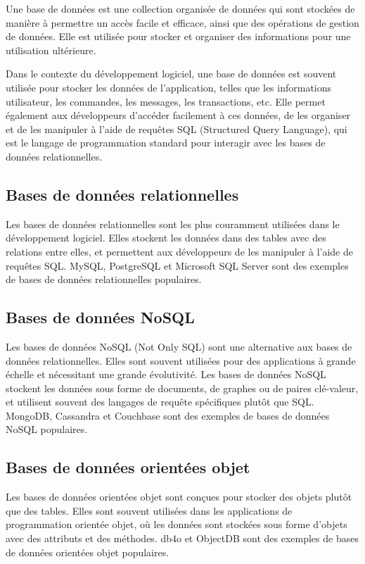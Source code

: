 Une base de données est une collection organisée de données qui sont stockées de manière à permettre un accès facile et efficace, ainsi que des opérations de gestion de données. Elle est utilisée pour stocker et organiser des informations pour une utilisation ultérieure.

Dans le contexte du développement logiciel, une base de données est souvent utilisée pour stocker les données de l'application, telles que les informations utilisateur, les commandes, les messages, les transactions, etc. Elle permet également aux développeurs d'accéder facilement à ces données, de les organiser et de les manipuler à l'aide de requêtes SQL (Structured Query Language), qui est le langage de programmation standard pour interagir avec les bases de données relationnelles.

\subsection{Bases de données relationnelles}\label{subsec:relational-databases}
Les bases de données relationnelles sont les plus couramment utilisées dans le développement logiciel. Elles stockent les données dans des tables avec des relations entre elles, et permettent aux développeurs de les manipuler à l'aide de requêtes SQL. MySQL, PostgreSQL et Microsoft SQL Server sont des exemples de bases de données relationnelles populaires.

\subsection{Bases de données NoSQL}\label{subsec:nosql-databases}
Les bases de données NoSQL (Not Only SQL) sont une alternative aux bases de données relationnelles. Elles sont souvent utilisées pour des applications à grande échelle et nécessitant une grande évolutivité. Les bases de données NoSQL stockent les données sous forme de documents, de graphes ou de paires clé-valeur, et utilisent souvent des langages de requête spécifiques plutôt que SQL. MongoDB, Cassandra et Couchbase sont des exemples de bases de données NoSQL populaires.

\subsection{Bases de données orientées objet}\label{subsec:object-oriented-databases}
Les bases de données orientées objet sont conçues pour stocker des objets plutôt que des tables. Elles sont souvent utilisées dans les applications de programmation orientée objet, où les données sont stockées sous forme d'objets avec des attributs et des méthodes. db4o et ObjectDB sont des exemples de bases de données orientées objet populaires.

